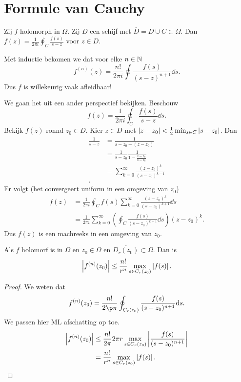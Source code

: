 \section{Formule van Cauchy} \label{sec:formule_van_cauchy}
\begin{stelling}
	Zij $f$ holomorph in $\Omega$. Zij $D$ een schijf met $\overline{D} = D \cup C \subset \Omega$. 
Dan $f(z)  = \frac{1}{2\pi i} \oint_{C} \frac{f(s)}{s - z}$ voor $z \in D$.
\end{stelling}
\begin{gevolg}
	 Met inductie bekomen we dat voor elke $n \in \mathbb{N}$ \[
		 f^{(n)}(z) = \frac{n!}{2\pi i} \oint \frac{f(s)}{(s - z)^{n + 1}} \dd s
	 .\] 
	 Dus $f$ is willekeurig vaak afleidbaar!
\end{gevolg}
We gaan het uit een ander perspectief bekijken.
Beschouw \[
	f(z) = \frac{1}{2 \pi i} \oint_C \frac{f(s)}{s - z} \dd s 
.\] 
Bekijk $f(z)$ ronnd $z_0 \in D$. Kier $z \in D$ met $\left| z - z_0 \right| < \frac{1}{ 2}\min_{s \in C}\left| s - z_0 \right|$.
Dan 
 \begin{align*}
	 \frac{1}{s-z} &=  \frac{1}{s - z_0 -(z- z_0)} \\
	 &= \frac{1}{s - z_0}\frac{1}{1 - \frac{z - z_0}{s - z_0}} \\
	 &= \sum_{k = 0}^{ \infty} \frac{(z - z_0)^{k}}{(s - z_0)^{k -1}} \\
.\end{align*}
Er volgt (het convergeert uniform in een omgeving van $z_0$)
\begin{align*}
	f(z)  &= \frac{1}{2 \pi i} \oint_C f(s) \sum_{k = 0}^{\infty}\frac{(z - z_0)^{k}}{(s - z_0)^{k + 1}} \dd s \\
	 &= \frac{1}{2 \pi i} \sum_{k = 0}^{\infty}\left( \oint_C \frac{f(s)}{(s - z_0)^{k+1}} \dd s \right) (z - z_0)^{k}
.\end{align*}
Dus $f(z) $ is een machreeks in een omgeving van  $z_0$.
\begin{gevolg}
	Als $f$ holomorf is in $\Omega$ en $z_0 \in \Omega$ en $\overline{D_r(z_0)}\subset \Omega$.
	Dan is \[
		\left| f^{(n)}(z_0) \right|  \le \frac{n!}{r^{n}} \max_{s \in C_r(z_0)}\left| f(s) \right|
	.\] 
\end{gevolg}
\begin{proof}
	We weten dat \[
		f^{(n)}(z_0) = \frac{n!}{2\p\pi} \oint_{C_r(z_0)}\frac{f(s)}{(s - z_0)^{n + 1}} \dd s
	.\] 
	We passen hier ML afschatting op toe. 
	 \begin{align*}
		 \left| f^{(n)}(z_0) \right| &\le \frac{n!}{2\pi }2 \pi r \max_{s \in C_r(z_0)} \left| \frac{f(s)}{(s - z_0)^{n + 1}} \right| \\&= \frac{n!}{r^{n}} \max _{s \in C_r(z_0)} \left| f(s) \right| 
	.\end{align*}
\end{proof}
